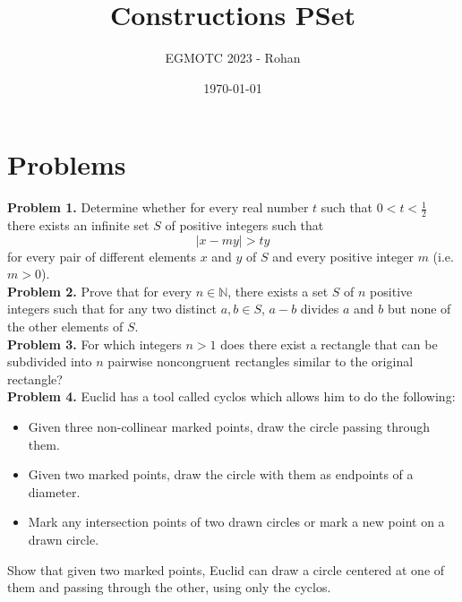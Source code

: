 \documentclass[12pt]{article}
\title{Constructions PSet}
\author{EGMOTC 2023 - Rohan}
\date{\today}
\begin{document}
\maketitle

\newcommand{\localtextbulletone}{\textcolor{black}{\raisebox{.45ex}{\rule{.6ex}{.6ex}}}}
\renewcommand{\labelitemi}{\localtextbulletone}

\section*{Problems}
\vspace{1cm}
\thispagestyle{empty}

\textbf{Problem 1.}
    Determine whether for every real number $t$ such that $0 < t < \tfrac{1}{2} $ there exists an infinite set $S$ of positive integers such that\[|x-my| > ty\]for every pair of different elements $x$ and $y$ of $S$ and every positive integer $m$ (i.e. $m > 0$).\\


\textbf{Problem 2.} Prove that for every $n\in \mathbb N$, there exists a set $S$ of $n$ positive integers such that for any two distinct $a,b\in S$, $a-b$ divides $a$ and $b$ but none of the other elements of $S$.\\

\textbf{Problem 3.} For which integers $n>1$ does there exist a rectangle that can be subdivided into $n$ pairwise noncongruent rectangles similar to the original rectangle?\\

\textbf{Problem 4.} Euclid has a tool called cyclos which allows him to do the following:
\begin{itemize}
    \item Given three non-collinear marked points, draw the circle passing through them.
    \item Given two marked points, draw the circle with them as endpoints of a diameter.
    \item Mark any intersection points of two drawn circles or mark a new point on a drawn circle.
\end{itemize}
Show that given two marked points, Euclid can draw a circle centered at one of them and passing through the other, using only the cyclos.
\end{document}
